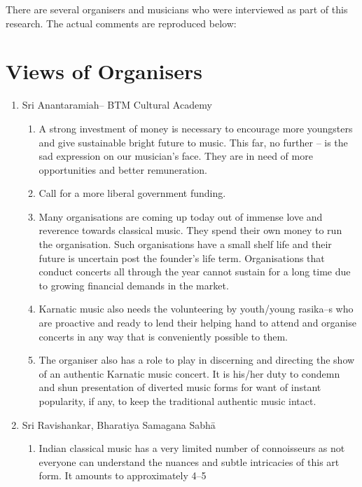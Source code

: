 There are several organisers and musicians who were interviewed as part of this research. The actual comments are reproduced below:


\section*{Views of Organisers}

\begin{enumerate}
\item Sri Anantaramiah– BTM Cultural Academy
 
\begin{enumerate}
\item A strong investment of money is necessary to encourage more youngsters and give sustainable bright future to music. This far, no further – is the sad expression on our musician’s face. They are in need of more opportunities and better remuneration.

 \item Call for a more liberal government funding.

 \item Many organisations are coming up today out of immense love and reverence towards classical music. They spend their own money to run the organisation. Such organisations have a small shelf life and their future is uncertain post the founder’s life term. Organisations that conduct concerts all through the year cannot sustain for a long time due to growing financial demands in the market.

 \item Karnatic music also needs the volunteering by youth/young rasika–s who are proactive and ready to lend their helping hand to attend and organise concerts in any way that is conveniently possible to them.

 \item The organiser also has a role to play in discerning and directing the show of an authentic Karnatic music concert. It is his/her duty to condemn and shun presentation of diverted music forms for want of instant popularity, if any, to keep the traditional authentic music intact.
\end{enumerate}

 \item Sri Ravishankar, Bharatiya Samagana Sabhā
 
\begin{enumerate}
\item Indian classical music has a very limited number of connoisseurs as not everyone can understand the nuances and subtle intricacies of this art form. It amounts to approximately 4–5\\%


\end{enumerate}
\end{enumerate}
